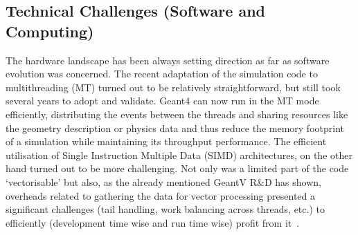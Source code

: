 \documentclass[11pt,a4paper]{article}
\begin{document}
\hypertarget{technical-challenges-software-and-computing-1}{%
\subsection{Technical Challenges (Software and
Computing)}\label{technical-challenges-software-and-computing-1}}

The hardware landscape has been always setting direction as far as
software evolution was concerned. The recent adaptation of the
simulation code to multithreading (MT) turned out to be relatively
straightforward, but still took several years to adopt and validate.
Geant4 can now run in the MT mode efficiently, distributing the events
between the threads and sharing resources like the geometry description
or physics data and thus reduce the memory footprint of a simulation
while maintaining its throughput performance. The efficient utilisation
of Single Instruction Multiple Data (SIMD) architectures, on the other
hand turned out to be more challenging. Not only was a limited part of
the code `vectorisable' but also, as the already mentioned GeantV R\&D
has shown, overheads related to gathering the data for vector processing
presented a significant challenges (tail handling, work balancing across
threads, etc.) to efficiently (development time wise and run time wise)
profit from it~\cite{GeantV}.
\end{document}
